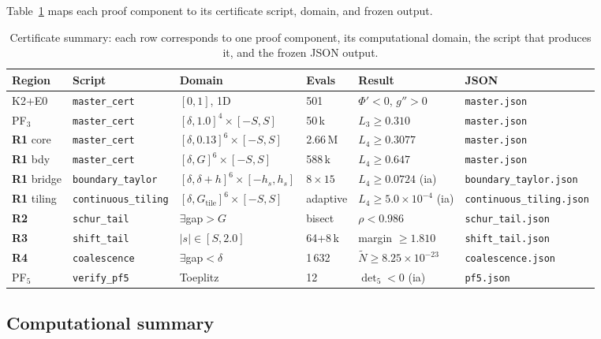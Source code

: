 \documentclass[11pt,a4paper]{amsart}
\theoremstyle{definition}
\theoremstyle{remark}
\newcommand{\Ntilde}{\tilde{N}}
\begin{document}
Table~\ref{tab:certs} maps each proof component to its certificate
script, domain, and frozen output.

\begin{table}[ht]
\caption{Certificate summary: each row corresponds to one
proof component, its computational domain, the script that
produces it, and the frozen JSON output.}\label{tab:certs}
\centering
\small
\begin{tabular}{@{}llllll@{}}
\toprule
Region & Script & Domain & Evals & Result & JSON \\
\midrule
K2+E0 & \texttt{master\_cert} & $[0,1]$, 1D & 501 &
  $\Phi'<0$, $g''\!>\!0$ & \texttt{master.json} \\
PF$_3$ & \texttt{master\_cert} & $[\delta,1.0]^4\!\times\![-S,S]$ & 50\,k &
  $L_3 \ge 0.310$ & \texttt{master.json} \\
\textbf{R1} core & \texttt{master\_cert} &
  $[\delta,0.13]^6\!\times\![-S,S]$ & 2.66\,M &
  $L_4 \ge 0.3077$ & \texttt{master.json} \\
\textbf{R1} bdy & \texttt{master\_cert} &
  $[\delta,G]^6\!\times\![-S,S]$ & 588\,k &
  $L_4 \ge 0.647$ & \texttt{master.json} \\
\textbf{R1} bridge & \texttt{boundary\_taylor} &
  $[\delta,\delta\!+\!h]^6\!\times\![-h_s,h_s]$ & $8\!\times\!15$ &
  $L_4 \ge 0.0724$ (ia) & \texttt{boundary\_taylor.json} \\
\textbf{R1} tiling & \texttt{continuous\_tiling} &
  $[\delta,G_{\mathrm{tile}}]^6\!\times\![-S,S]$ & adaptive &
  $L_4 \ge 5.0 \times 10^{-4}$ (ia) & \texttt{continuous\_tiling.json} \\
\textbf{R2} & \texttt{schur\_tail} &
  $\exists$gap$\!>\!G$ & bisect &
  $\rho < 0.986$ & \texttt{schur\_tail.json} \\
\textbf{R3} & \texttt{shift\_tail} &
  $|s|\!\in\![S,2.0]$ & 64+8\,k &
  margin $\ge 1.810$ & \texttt{shift\_tail.json} \\
\textbf{R4} & \texttt{coalescence} &
  $\exists$gap$\!<\!\delta$ & 1\,632 &
  $\Ntilde \ge 8.25\!\times\!10^{-23}$ & \texttt{coalescence.json} \\
PF$_5$ & \texttt{verify\_pf5} &
  Toeplitz & 12 &
  $\det_5 < 0$ (ia) & \texttt{pf5.json} \\
\bottomrule
\end{tabular}
\end{table}

\subsection{Computational summary}
\end{document}
